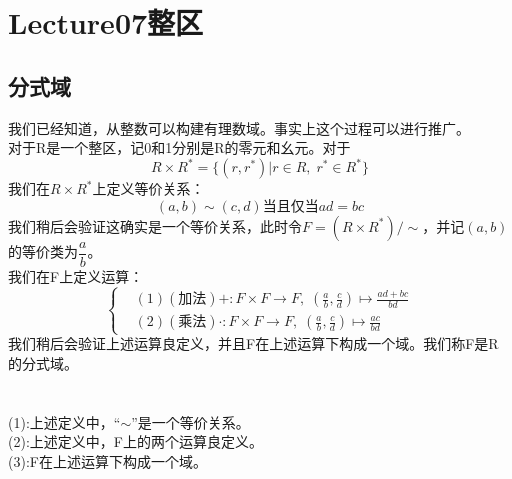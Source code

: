 \chapter*{Lecture07整区}

\section{分式域}
我们已经知道，从整数可以构建有理数域。事实上这个过程可以进行推广。\\
对于R是一个整区，记0和1分别是R的零元和幺元。对于
\[
R\times R^*=\{(r,r^*)|r\in R,\; r^*\in R^*\}
\]
我们在$R\times R^*$上定义等价关系：
\[
(a,b)\sim(c,d)\text{当且仅当}ad=bc
\]
我们稍后会验证这确实是一个等价关系，此时令$F=(R\times R^*)/\sim$，并记$(a,b)$的等价类为$\dfrac{a}{b}$。\\
我们在F上定义运算：
\[
\left\{
\begin{aligned}
&(1)(\text{加法}) +\colon F\times F\to F ,\; (\frac{a}{b},\frac{c}{d})\mapsto \frac{ad+bc}{bd}\\
&(2)(\text{乘法}) \cdot\colon F\times F\to F ,\; (\frac{a}{b},\frac{c}{d})\mapsto \frac{ac}{bd}
\end{aligned}\right.
\]
我们稍后会验证上述运算良定义，并且F在上述运算下构成一个域。我们称F是R的分式域。\\
\\
\\
\indent (1):上述定义中，“$\sim$”是一个等价关系。\\
\indent (2):上述定义中，F上的两个运算良定义。\\
\indent (3):F在上述运算下构成一个域。\\

